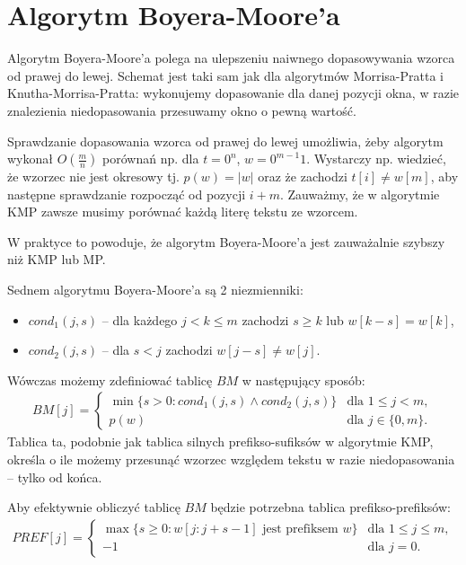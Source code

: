 \section{Algorytm Boyera-Moore'a}

Algorytm Boyera-Moore'a polega na ulepszeniu naiwnego dopasowywania wzorca od prawej do lewej.
Schemat jest taki sam jak dla algorytmów Morrisa-Pratta i Knutha-Morrisa-Pratta: wykonujemy dopasowanie dla danej pozycji okna, w razie znalezienia niedopasowania przesuwamy okno o pewną wartość.

Sprawdzanie dopasowania wzorca od prawej do lewej umożliwia, żeby algorytm wykonał $O\left(\frac{m}{n}\right)$ porównań np. dla $t = 0^n$, $w = 0^{m - 1}1$. Wystarczy np. wiedzieć, że wzorzec nie jest okresowy tj. $p(w) = |w|$ oraz że zachodzi $t[i] \neq w[m]$, aby następne sprawdzanie rozpocząć od pozycji $i + m$. Zauważmy, że w algorytmie KMP zawsze musimy porównać każdą literę tekstu ze wzorcem.

W praktyce to powoduje, że algorytm Boyera-Moore'a jest zauważalnie szybszy niż KMP lub MP.

Sednem algorytmu Boyera-Moore'a są 2 niezmienniki:
\begin{itemize}
  \item $cond_1(j, s)$ -- dla każdego $j  < k \le m$ zachodzi $s \ge k$ lub $w[k - s] = w[k]$,
  \item $cond_2(j, s)$ -- dla $s < j$ zachodzi $w[j - s] \neq w[j]$.
\end{itemize}

Wówczas możemy zdefiniować tablicę $BM$ w następujący sposób:
\begin{align*}
  BM[j] =
  \begin{cases}
    \min \{s > 0: cond_1(j, s) \land cond_2(j, s)\} & \text{dla $1 \le j < m$}, \\
    p(w) & \text{dla $j \in \{0, m\}$}.
  \end{cases}
\end{align*}
Tablica ta, podobnie jak tablica silnych prefikso-sufiksów w algorytmie KMP, określa o ile możemy przesunąć wzorzec względem tekstu w razie niedopasowania -- tylko od końca.

Aby efektywnie obliczyć tablicę $BM$ będzie potrzebna tablica prefikso-prefiksów:
\begin{align*}
  PREF[j] =
  \begin{cases}
    \max \{s \ge 0: \text{$w[j:j + s - 1]$ jest prefiksem $w$}\} & \text{dla $1 \le j \le m$}, \\
    -1 & \text{dla $j = 0$}.
  \end{cases}
\end{align*}

